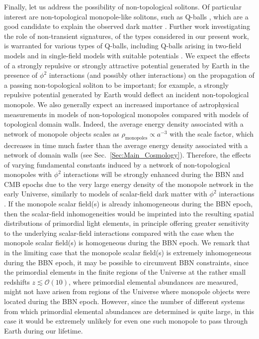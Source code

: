\documentclass[aps,prd,onecolumn,nofootinbib]{revtex4-2} %
\begin{document}
Finally, let us address the possibility of non-topological solitons. 
Of particular interest are non-topological monopole-like solitons, such as Q-balls \cite{Q-ball_1976_2-field,Q-ball_1985_flat-directions}, which are a good candidate to explain the observed dark matter \cite{Q-ball_1997_DM,Q-ball_1998_DM}. 
Further work investigating the role of non-transient signatures, of the types considered in our present work, is warranted for various types of Q-balls, including Q-balls arising in two-field models \cite{Q-ball_1976_2-field} and in single-field models with suitable potentials \cite{Q-ball_1985_flat-directions,Q-ball_1997-specific_potential}. 
We expect the effects of a strongly repulsive or strongly attractive potential generated by Earth in the presence of $\phi^2$ interactions (and possibly other interactions) on the propagation of a passing non-topological soliton to be important; 
for example, a strongly repulsive potential generated by Earth would deflect an incident non-topological monopole. 
We also generally expect an increased importance of astrophysical measurements in models of non-topological monopoles compared with models of topological domain walls. 
Indeed, the average energy density associated with a network of monopole objects scales as $\rho_\textrm{monopoles} \propto a^{-3}$ with the scale factor, which decreases in time much faster than the average energy density associated with a network of domain walls (see Sec.~\ref{Sec:Main_Cosmology}). 
Therefore, the effects of varying fundamental constants induced by a network of non-topological monopoles with $\phi^2$ interactions will be strongly enhanced during the BBN and CMB epochs due to the very large energy density of the monopole network in the early Universe, similarly to models of scalar-field dark matter with $\phi^2$ interactions \cite{Stadnik_2015_DM-VFCs}. 
If the monopole scalar field(s) is already inhomogeneous during the BBN epoch, then the scalar-field inhomogeneities would be imprinted into the resulting spatial distributions of primordial light elements, in principle offering greater sensitivity to the underlying scalar-field interactions compared with the case when the monopole scalar field(s) is homogeneous during the BBN epoch. 
We remark that in the limiting case that the monopole scalar field(s) is extremely inhomogeneous during the BBN epoch, it may be possible to circumvent BBN constraints, since the primordial elements in the finite regions of the Universe at the rather small redshifts $z \lesssim \mathcal{O}(10)$, where primordial elemental abundances are measured, might not have arisen from regions of the Universe where monopole objects were located during the BBN epoch. 
However, since the number of different systems from which primordial elemental abundances are determined is quite large, in this case it would be extremely unlikely for even one such monopole to pass through Earth during our lifetime. 
\end{document}
